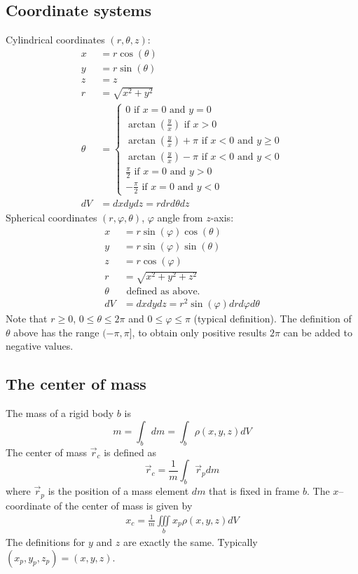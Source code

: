 \subsection{Coordinate systems}
Cylindrical coordinates $(r, \theta, z)$:
\begin{align}
    x &= r\cos(\theta)\\
    y &= r\sin(\theta)\\
    z &= z\\
    r &= \sqrt{x^2 + y^2}\\
    \theta &= 
    \begin{cases}
    0 \text{ if } x = 0 \text{ and } y = 0\\
    \arctan(\frac{y}{x}) \text{ if } x > 0\\
    \arctan(\frac{y}{x}) + \pi \text{ if } x < 0 \text{ and } y \geq 0\\
    \arctan(\frac{y}{x}) - \pi \text{ if } x < 0 \text{ and } y < 0\\
    \frac{\pi}{2} \text{ if } x = 0 \text{ and } y > 0\\
    -\frac{\pi}{2} \text{ if } x = 0 \text{ and } y < 0
    \end{cases}\\
    dV &= dxdydz = rdrd\theta dz
\end{align}
Spherical coordinates $(r, \varphi, \theta)$, $\varphi$ angle from $z$-axis:
\begin{align}
    x &= r\sin(\varphi)\cos(\theta)\\
    y &= r\sin(\varphi)\sin(\theta)\\
    z &= r\cos(\varphi)\\
    r &= \sqrt{x^2 + y^2 + z^2}\\
    \theta &\text{ defined as above.}\\
    dV &= dxdydz = r^2\sin(\varphi)dr d\varphi d\theta
\end{align}
Note that $r \geq 0$, $0 \leq \theta \leq 2\pi$ and $0 \leq \varphi \leq \pi$ (typical definition). The definition of $\theta$ above has the range $(-\pi, \pi]$, to obtain only positive results $2\pi$ can be added to negative values.

\subsection{The center of mass}
The mass of a rigid body $b$ is
\begin{equation}
    m = \int_{b}dm = \int_{b} \rho(x,y,z)dV
\end{equation}
The center of mass $\vec{r}_c$ is defined as
\begin{equation}
    \vec{r}_c = \frac{1}{m} \int_{b} \vec{r}_p dm
\end{equation}
where $\vec{r}_p$ is the position of a mass element $dm$ that is fixed in frame $b$. The $x$--coordinate of the center of mass is given by
\begin{align}
    x_c = \frac{1}{m} \iiint \limits_b x_p \rho(x,y,z)dV
\end{align}
The definitions for $y$ and $z$ are exactly the same. Typically $(x_p, y_p, z_p) = (x, y, z)$.

